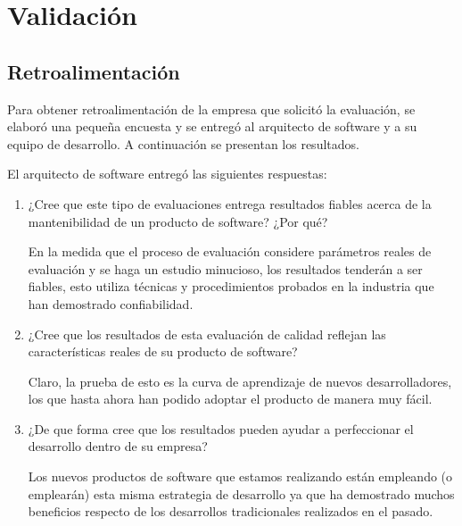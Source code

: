 \chapter{Validación}
\label{chap:validacion}
\section{Retroalimentación}

Para obtener retroalimentación de la empresa que solicitó la evaluación, se elaboró una
pequeña encuesta y se entregó al arquitecto de software y a su equipo de desarrollo.
A continuación se presentan los resultados.

El arquitecto de software entregó las siguientes respuestas:
\begin{enumerate}
    \item ¿Cree que este tipo de evaluaciones entrega resultados fiables acerca de la mantenibilidad de un producto de software? ¿Por qué?

En la medida que el proceso de evaluación considere parámetros reales de evaluación y 
se haga un estudio minucioso, los resultados tenderán a ser fiables, 
esto utiliza técnicas y procedimientos probados en la industria que han demostrado confiabilidad.

\item ¿Cree que los resultados de esta evaluación de calidad reflejan las características reales de su producto de software?

Claro, la prueba de esto es la curva de aprendizaje de nuevos desarrolladores, 
los que hasta ahora han podido adoptar el producto de manera muy fácil.

\item ¿De que forma cree que los resultados pueden ayudar a perfeccionar el desarrollo dentro de su empresa?

Los nuevos productos de software que estamos realizando están empleando (o emplearán)
esta misma estrategia de desarrollo ya que ha demostrado muchos beneficios 
respecto de los desarrollos tradicionales realizados en el pasado.
\end{enumerate}
